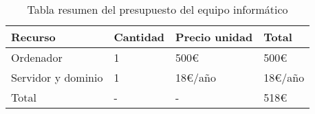 \begin{table}[!ht]
\begin{center}
\begin{tabular}{|p{55mm}|p{25mm}|p{40mm}|p{25mm}|} \hline 
\textbf{Recurso} & \textbf{Cantidad} & \textbf{Precio unidad} & \textbf{Total}\\ \hline
Ordenador & 1 & 500\euro & 500\euro \\ \hline

Servidor y dominio & 1 & 18\euro/año & 18\euro/año \\ \hline

Total & - & - & 518\euro  \\ \hline

\end{tabular}
\end{center}
\caption{Tabla resumen del presupuesto del equipo informático}
\label{table:resOthers}
\end{table}
